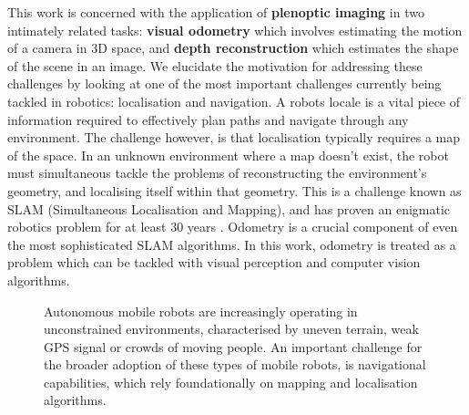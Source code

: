 This work is concerned with the application of \textbf{plenoptic imaging} in two intimately related tasks: \textbf{visual odometry} which involves estimating the motion of a camera in 3D space, and \textbf{depth reconstruction} which estimates the shape of the scene in an image. We elucidate the motivation for addressing these challenges by looking at one of the most important challenges currently being tackled in robotics: localisation and navigation. A robots locale is a vital piece of information required to effectively plan paths and navigate through any environment. The challenge however, is that localisation typically requires a map of the space. In an unknown environment where a map doesn't exist, the robot must simultaneous tackle the problems of reconstructing the environment's geometry, and localising itself within that geometry. This is a challenge known as SLAM (Simultaneous Localisation and Mapping), and has proven an enigmatic robotics problem for at least 30 years \cite{cadena2016slam, kuehefuss2016rgbdslam}. Odometry is a crucial component of even the most sophisticated SLAM algorithms. In this work, odometry is treated as a problem which can be tackled with visual perception and computer vision algorithms. 

\begin{figure}[htbp]
    
    
    \caption[Examples of robots that operate in unconstrained spaces.]{Autonomous mobile robots are increasingly operating in unconstrained environments, characterised by uneven terrain, weak GPS signal or crowds of moving people. An important challenge for the broader adoption of these types of mobile robots, is navigational capabilities, which rely foundationally on mapping and localisation algorithms.}
\end{figure}


